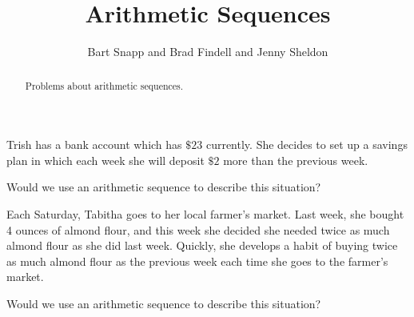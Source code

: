 \documentclass[nooutcomes]{ximera}
\title{Arithmetic Sequences}
\author{Bart Snapp and Brad Findell and Jenny Sheldon}
\begin{document}
\begin{abstract}
Problems about arithmetic sequences.
\end{abstract}
\maketitle




\begin{problem}
Trish has a bank account which has $\$23$ currently.  She decides to set up a savings plan in which each week she will deposit $\$2$ more than the previous week.

Would we use an arithmetic sequence to describe this situation?
\begin{multipleChoice}
\end{multipleChoice}

\begin{problem}
Each Saturday, Tabitha goes to her local farmer's market.  Last week, she bought 4 ounces of almond flour, and this week she decided she needed twice as much almond flour as she did last week.  Quickly, she develops a habit of buying twice as much almond flour as the previous week each time she goes to the farmer's market.

Would we use an arithmetic sequence to describe this situation?
\begin{multipleChoice}
\end{multipleChoice}
\end{problem}
\end{problem}
\end{document}
